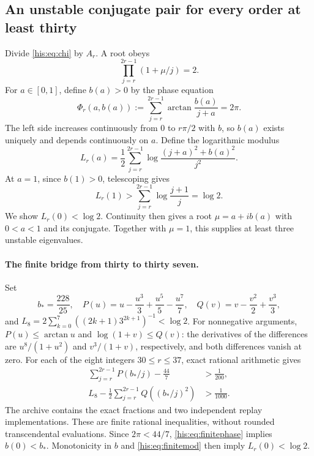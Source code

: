 \subsection{An unstable conjugate pair for every order at least thirty}\label{his:sec:phase}
Divide \eqref{his:eq:chi} by $A_r$. A root obeys
\[
 \prod_{j=r}^{2r-1}(1+\mu/j)=2.
\]
For $a\in[0,1]$, define $b(a)>0$ by the phase equation
\begin{equation}\label{his:eq:phase}
 \Phi_r(a,b(a)):=\sum_{j=r}^{2r-1}\arctan\frac{b(a)}{j+a}=2\pi.
\end{equation}
The left side increases continuously from $0$ to $r\pi/2$ with $b$, so $b(a)$ exists uniquely and depends continuously on $a$. Define the logarithmic modulus
\begin{equation}\label{his:eq:logmod}
 L_r(a)=\frac12\sum_{j=r}^{2r-1}
 \log\frac{(j+a)^2+b(a)^2}{j^2}.
\end{equation}
At $a=1$, since $b(1)>0$, telescoping gives
\[
 L_r(1)>\sum_{j=r}^{2r-1}\log\frac{j+1}{j}=\log2.
\]
We show $L_r(0)<\log2$. Continuity then gives a root $\mu=a+ib(a)$ with $0<a<1$ and its conjugate. Together with $\mu=1$, this supplies at least three unstable eigenvalues.

\paragraph{The finite bridge from thirty to thirty seven.}
Set
\[
 b_*=\frac{228}{25},\quad
 P(u)=u-\frac{u^3}3+\frac{u^5}5-\frac{u^7}7,\quad
 Q(v)=v-\frac{v^2}2+\frac{v^3}3,
\]
and $L_8=2\sum_{k=0}^7((2k+1)3^{2k+1})^{-1}<\log2$. For nonnegative arguments,
$P(u)\le\arctan u$ and $\log(1+v)\le Q(v)$: the derivatives of the differences are $u^8/(1+u^2)$ and $v^3/(1+v)$, respectively, and both differences vanish at zero.
For each of the eight integers $30\le r\le37$, exact rational arithmetic gives
\begin{align}
 \sum_{j=r}^{2r-1}P(b_*/j)-\frac{44}7&>\frac1{200},\label{his:eq:finitephase}\\
 L_8-\frac12\sum_{j=r}^{2r-1}Q((b_*/j)^2)&>\frac1{1000}.\label{his:eq:finitemod}
\end{align}
The archive contains the exact fractions and two independent replay implementations. These are finite rational inequalities, without rounded transcendental evaluations. Since $2\pi<44/7$, \eqref{his:eq:finitephase} implies $b(0)<b_*$. Monotonicity in $b$ and \eqref{his:eq:finitemod} then imply $L_r(0)<\log2$.

